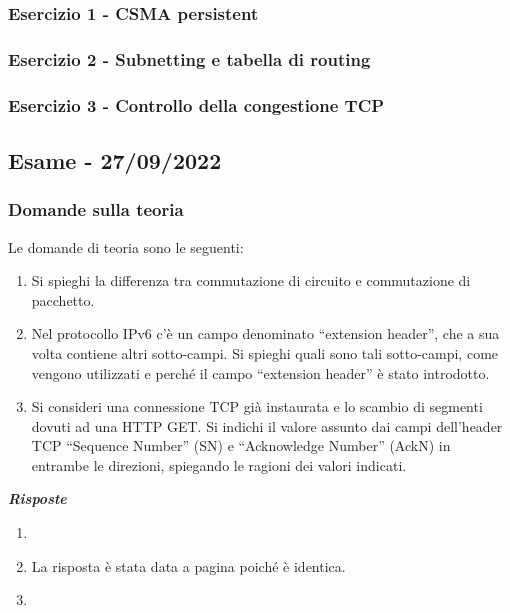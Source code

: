\documentclass[a4paper]{article}
\newcommand{\dquotes}[1]{``#1''}
\begin{document}
	\subsubsection{Esercizio 1 - CSMA persistent}
	
	\subsubsection{Esercizio 2 - Subnetting e tabella di routing}
	
	\subsubsection{Esercizio 3 - Controllo della congestione TCP}
	
	\newpage

	\subsection[\textbf{Esame - 27/09/2022}]{Esame - 27/09/2022}
	
	\subsubsection{Domande sulla teoria}
	Le domande di teoria sono le seguenti:
	\begin{enumerate}
		\item Si spieghi la differenza tra commutazione di circuito e commutazione di pacchetto.
		
		\item Nel protocollo IPv6 c'è un campo denominato \dquotes{extension header}, che a sua volta contiene altri sotto-campi. Si spieghi quali sono tali sotto-campi, come vengono utilizzati e perché il campo \dquotes{extension header} è stato introdotto.
		
		\item Si consideri una connessione TCP già instaurata e lo scambio di segmenti dovuti ad una HTTP GET. Si indichi il valore assunto dai campi dell'header TCP \dquotes{Sequence Number} (SN) e \dquotes{Acknowledge Number} (AckN) in entrambe le direzioni, spiegando le ragioni dei valori indicati.
	\end{enumerate}
	\textcolor{Green4}{\textbf{\emph{Risposte}}}
	\begin{enumerate}
		\item 
		
		\item La risposta è stata data a pagina \pageref{IPv6 extension header} poiché è identica.
		
		\item 
	\end{enumerate}
	
\end{document}
